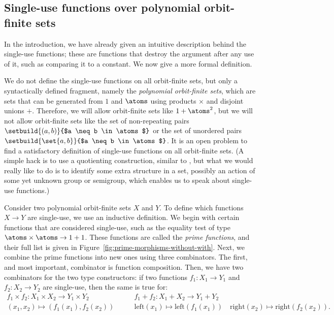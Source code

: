 \subsection{Single-use functions over polynomial orbit-finite sets}
\label{sec:single-use-functions-over-polynomial-orbit-finite-sets}

In the introduction, we have already given an intuitive description behind the single-use functions; these are functions that destroy the argument after any use of it, such as comparing it to a constant. We now give a more formal definition.

We do not define the single-use functions on all orbit-finite sets, but only a syntactically defined fragment, namely the \emph{polynomial orbit-finite sets}, which are sets that can be generated from $1$ and $\atoms$ using  
 products $\times$ and disjoint unions $+$. Therefore, we will allow orbit-finite sets like $1 + \atoms^2$, but we will not allow orbit-finite sets like 
the set of non-repeating pairs
$\setbuild{(a,b)}{$a \neq b \in \atoms$}$ or the set of unordered pairs $\setbuild{\set{a,b}}{$a \neq b \in \atoms$}$. It is an open problem to find a satisfactory definition of single-use functions on all orbit-finite sets. (A simple hack is to use a quotienting construction, similar to , but what we would really like to do is to identify some extra structure in a set, possibly an action of some yet unknown group or semigroup, which enables us to speak about single-use functions.)

Consider two polynomial orbit-finite sets $X$ and $Y$. To define which functions $X \to Y$ are single-use, we use an inductive definition. We begin with certain functions that are considered single-use, such as the equality test of type $\atoms \times \atoms \to 1 + 1$. These functions are called the \emph{prime functions}, and their full list is given in Figure~\ref{fig:prime-morphisms-without-with}. Next, we combine the prime functions into new ones using three combinators. The first, and most important, combinator is  function composition. Then, we have two combinators for the two type constructors: if two functions $f_1 : X_1 \to Y_1$ and $f_2 : X_2 \to Y_2$ are single-use, then the same is true for:
\begin{align*}
    f_1 \times f_2 : X_1 \times X_2 \to Y_1 \times Y_2
    \qquad &
    f_1 + f_2 : X_1 + X_2 \to Y_1 + Y_2 \\
    \scriptstyle  (x_1,x_2) \mapsto (f_1(x_1),f_2(x_2)) 
    \qquad &
    {\scriptstyle \text{left}(x_1) \mapsto \text{left}(f_1(x_1)) 
        \quad 
        \text{right}(x_2) \mapsto \text{right}(f_2(x_2)) }.
\end{align*}

